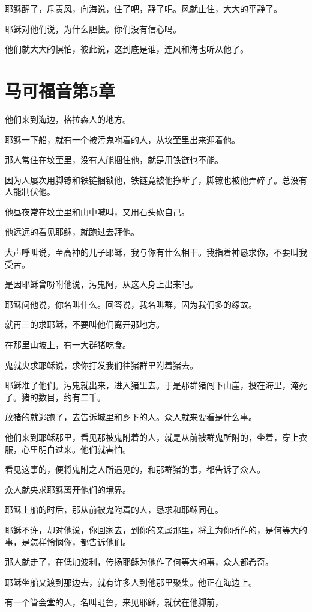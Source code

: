 \documentclass[12pt,oneside]{book}
\begin{document}
耶稣醒了，斥责风，向海说，住了吧，静了吧。风就止住，大大的平静了。

耶稣对他们说，为什么胆怯。你们没有信心吗。

他们就大大的惧怕，彼此说，这到底是谁，连风和海也听从他了。

\chapter{马可福音第5章}
他们来到海边，格拉森人的地方。

耶稣一下船，就有一个被污鬼咐着的人，从坟茔里出来迎着他。

那人常住在坟茔里，没有人能捆住他，就是用铁链也不能。

因为人屡次用脚镣和铁链捆锁他，铁链竟被他挣断了，脚镣也被他弄碎了。总没有人能制伏他。

他昼夜常在坟茔里和山中喊叫，又用石头砍自己。

他远远的看见耶稣，就跑过去拜他。

大声呼叫说，至高神的儿子耶稣，我与你有什么相干。我指着神恳求你，不要叫我受苦。

是因耶稣曾吩咐他说，污鬼阿，从这人身上出来吧。

耶稣问他说，你名叫什么。回答说，我名叫群，因为我们多的缘故。

就再三的求耶稣，不要叫他们离开那地方。

在那里山坡上，有一大群猪吃食。

鬼就央求耶稣说，求你打发我们往猪群里附着猪去。

耶稣准了他们。污鬼就出来，进入猪里去。于是那群猪闯下山崖，投在海里，淹死了。猪的数目，约有二千。

放猪的就逃跑了，去告诉城里和乡下的人。众人就来要看是什么事。

他们来到耶稣那里，看见那被鬼附着的人，就是从前被群鬼所附的，坐着，穿上衣服，心里明白过来。他们就害怕。

看见这事的，便将鬼附之人所遇见的，和那群猪的事，都告诉了众人。

众人就央求耶稣离开他们的境界。

耶稣上船的时后，那从前被鬼附着的人，恳求和耶稣同在。

耶稣不许，却对他说，你回家去，到你的亲属那里，将主为你所作的，是何等大的事，是怎样怜悯你，都告诉他们。

那人就走了，在低加波利，传扬耶稣为他作了何等大的事，众人都希奇。

耶稣坐船又渡到那边去，就有许多人到他那里聚集。他正在海边上。

有一个管会堂的人，名叫睚鲁，来见耶稣，就伏在他脚前，
\end{document}
